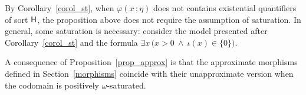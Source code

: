 \documentclass[10pt,oneside]{amsproc}
\begin{document}

\def\ceq#1#2#3{\parbox[t]{20ex}{$\displaystyle #1$}\parbox{5ex}{\hfil $#2$}{$\displaystyle #3$}}

  By Corollary~\ref{corol_st}, when $\varphi(x\,;\eta)$ does not contains existential quantifiers of sort ${\sf H}$, the proposition above does not require the assumption of saturation.
  In general, some saturation is necessary: consider the model presented after Corollary~\ref{corol_st} and the formula $\exists x\,\big(x>0\ \wedge\ \iota(x)\in\{0\}\big)$. 

A consequence of Proposition~\ref{prop_approx} is that the approximate morphisms defined in Section~\ref{morphisms} coincide with their unapproximate version when the codomain is positively $\omega$-saturated.








  
\end{document}
